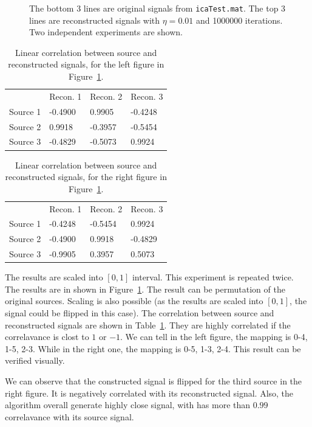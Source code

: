 \documentclass[10pt]{article}
\begin{document}
\begin{figure}[h]
\begin{subfigure}{0.49\textwidth}
\end{subfigure}
\caption{The bottom 3 lines are original signals from
\texttt{icaTest.mat}. The top 3 lines are reconstructed signals with $\eta
= 0.01$ and 1000000 iterations. Two independent experiments are shown.}
\label{fig:rep}
\end{figure}

\begin{table}
\centering
\begin{tabular}{ | l l l l | }
\hline
& Recon. 1& Recon. 2& Recon. 3\\
Source 1&-0.4900& 0.9905& -0.4248\\
Source 2&0.9918& -0.3957& -0.5454\\
Source 3&-0.4829& -0.5073& 0.9924\\
\hline
\end{tabular}
\caption{Linear correlation between source and reconstructed signals, for
the left figure in Figure~\ref{fig:rep}.}
\label{tbl:corr}
\end{table}

\begin{table}
\centering
\begin{tabular}{ | l l l l | }
\hline
& Recon. 1& Recon. 2& Recon. 3\\
Source 1 &-0.4248&-0.5454& 0.9924\\
Source 2 &-0.4900& 0.9918&-0.4829\\
Source 3 &-0.9905& 0.3957& 0.5073\\
\hline
\end{tabular}
\caption{Linear correlation between source and reconstructed signals, for
the right figure in Figure~\ref{fig:rep}.}
\end{table}

The results are scaled into $[0, 1]$ interval. This experiment is repeated
twice.  The results are in shown in Figure~\ref{fig:rep}. The result can be
permutation of the original sources. Scaling is also possible (as the
results are scaled into $[0, 1]$, the signal could be flipped in this
case). The correlation between source and reconstructed signals are shown in
Table~\ref{tbl:corr}. They are highly correlated if the correlavance is
clost to $1$ or $-1$. We can tell in the left figure, the mapping is
0-4, 1-5, 2-3. While in the right one, the mapping is 0-5, 1-3, 2-4. This
result can be verified visually.

We can observe that the constructed signal is flipped for the third source
in the right figure. It is negatively correlated with its reconstructed
signal. Also, the algorithm overall generate highly close signal, with has
more than $0.99$ correlavance with its source signal.
\end{document}
